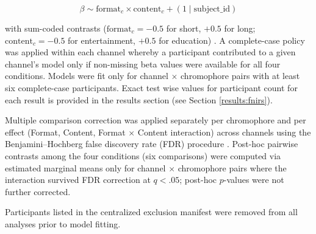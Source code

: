 \documentclass[10pt, twocolumn]{article}
\begin{document}
\begin{equation}
\beta \sim \text{format}_c \times \text{content}_c + (1 \mid \text{subject\_id})
\end{equation}

\noindent with sum-coded contrasts ($\text{format}_c = -0.5$ for short, $+0.5$ for long; $\text{content}_c = -0.5$ for entertainment, $+0.5$ for education) \cite{Kuznetsova2017lmerTestPT}. A complete-case policy was applied within each channel whereby a participant contributed to a given channel's model only if non-missing beta values were available for all four conditions. Models were fit only for channel $\times$ chromophore pairs with at least six complete-case participants. Exact test wise values for participant count for each result is provided in the results section (see Section \ref{results:fnirs}).

Multiple comparison correction was applied separately per chromophore and per effect (Format, Content, Format $\times$ Content interaction) across channels using the Benjamini--Hochberg false discovery rate (FDR) procedure \cite{Benjamini1995ControllingTF}. Post-hoc pairwise contrasts among the four conditions (six comparisons) were computed via estimated marginal means \cite{emmeansR, Searle1980PopulationMM} only for channel $\times$ chromophore pairs where the interaction survived FDR correction at $q < .05$; post-hoc $p$-values were not further corrected.

Participants listed in the centralized exclusion manifest were removed from all analyses prior to model fitting.



\end{document}
